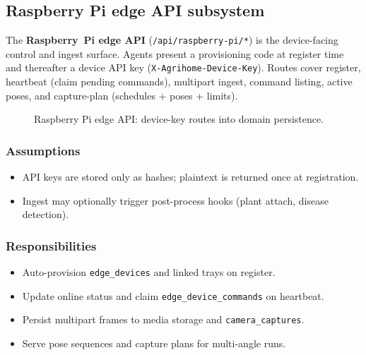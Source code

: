 \subsection{Raspberry Pi edge API subsystem}

The \textbf{Raspberry~Pi edge API} (\texttt{/api/raspberry-pi/*}) is the device-facing control and ingest surface. Agents present a provisioning code at register time and thereafter a device API key (\texttt{X-Agrihome-Device-Key}). Routes cover register, heartbeat (claim pending commands), multipart ingest, command listing, active poses, and capture-plan (schedules + poses + limits).

\begin{figure}[H]
\centering
{}
\caption{Raspberry Pi edge API: device-key routes into domain persistence.}
\label{fig:app-rpi}
\end{figure}

\subsubsection{Assumptions}
\begin{itemize}
  \item API keys are stored only as hashes; plaintext is returned once at registration.
  \item Ingest may optionally trigger post-process hooks (plant attach, disease detection).
\end{itemize}

\subsubsection{Responsibilities}
\begin{itemize}
  \item Auto-provision \texttt{edge\_devices} and linked trays on register.
  \item Update online status and claim \texttt{edge\_device\_commands} on heartbeat.
  \item Persist multipart frames to media storage and \texttt{camera\_captures}.
  \item Serve pose sequences and capture plans for multi-angle runs.
\end{itemize}

